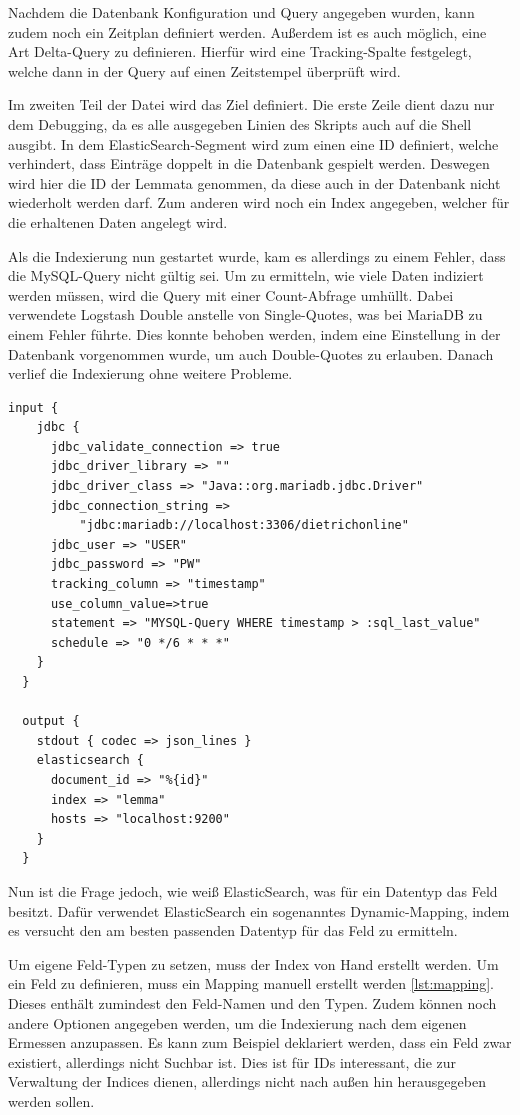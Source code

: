 Nachdem die Datenbank Konfiguration und Query angegeben wurden, kann zudem noch ein Zeitplan definiert werden. Außerdem ist es auch möglich, eine Art Delta-Query zu definieren. Hierfür wird eine Tracking-Spalte festgelegt, welche dann in der Query auf einen Zeitstempel überprüft wird.

Im zweiten Teil der Datei wird das Ziel definiert. Die erste Zeile dient dazu nur dem Debugging, da es alle ausgegeben Linien des Skripts auch auf die Shell ausgibt. In dem ElasticSearch-Segment wird zum einen eine ID definiert, welche verhindert, dass Einträge doppelt in die Datenbank gespielt werden. Deswegen wird hier die ID der Lemmata genommen, da diese auch in der Datenbank nicht wiederholt werden darf. Zum anderen wird noch ein Index angegeben, welcher für die erhaltenen Daten angelegt wird. 

Als die Indexierung nun gestartet wurde, kam es allerdings zu einem Fehler, dass die MySQL-Query nicht gültig sei. Um zu ermitteln, wie viele Daten indiziert werden müssen, wird die Query mit einer Count-Abfrage umhüllt. Dabei verwendete Logstash Double anstelle von Single-Quotes, was bei MariaDB zu einem Fehler führte. Dies konnte behoben werden, indem eine Einstellung in der Datenbank vorgenommen wurde, um auch Double-Quotes zu erlauben. 
Danach verlief die Indexierung ohne weitere Probleme.

\begin{lstlisting}[language=xml, frame=single, label={lst:lsConf}] 
  input {
    jdbc {
      jdbc_validate_connection => true
      jdbc_driver_library => ""
      jdbc_driver_class => "Java::org.mariadb.jdbc.Driver"
      jdbc_connection_string =>
          "jdbc:mariadb://localhost:3306/dietrichonline"
      jdbc_user => "USER"
      jdbc_password => "PW"
      tracking_column => "timestamp"
      use_column_value=>true
      statement => "MYSQL-Query WHERE timestamp > :sql_last_value"
      schedule => "0 */6 * * *"
    }
  }
  
  output {
    stdout { codec => json_lines }
    elasticsearch {
      document_id => "%{id}"
      index => "lemma"
      hosts => "localhost:9200"
    }
  }
\end{lstlisting}

Nun ist die Frage jedoch, wie weiß ElasticSearch, was für ein Datentyp das Feld besitzt. Dafür verwendet ElasticSearch ein sogenanntes Dynamic-Mapping, indem es versucht den am besten passenden Datentyp für das Feld zu ermitteln.

Um eigene Feld-Typen zu setzen, muss der Index von Hand erstellt werden. Um ein Feld zu definieren, muss ein Mapping manuell erstellt werden \ref{lst:mapping}. Dieses enthält zumindest den Feld-Namen und den Typen. Zudem können noch andere Optionen angegeben werden, um die Indexierung nach dem eigenen Ermessen anzupassen. Es kann zum Beispiel deklariert werden, dass ein Feld zwar existiert, allerdings nicht Suchbar ist. Dies ist für IDs interessant, die zur Verwaltung der Indices dienen, allerdings nicht nach außen hin herausgegeben werden sollen.

